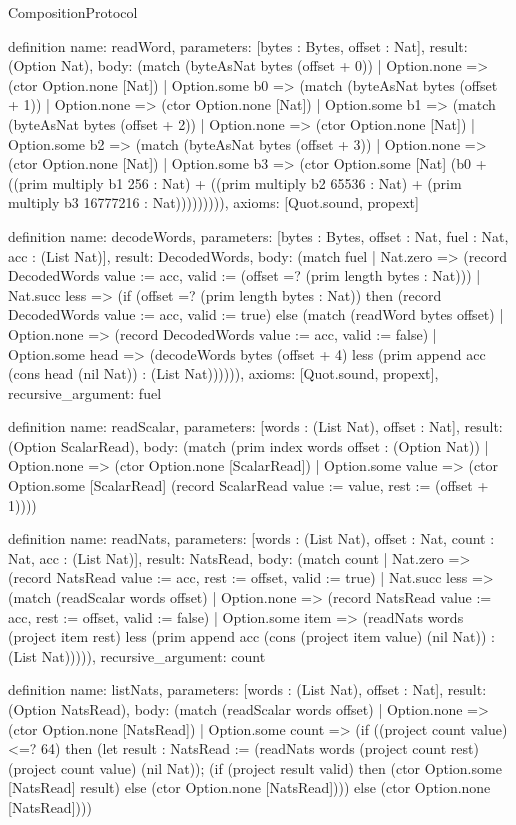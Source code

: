 \begin{lexlean}{CompositionProtocol}
\begin{semanticmodule}
definition{
  name: readWord,
  parameters: [bytes : Bytes, offset : Nat],
  result: (Option Nat),
  body: (match (byteAsNat bytes (offset + 0))
    | Option.none => (ctor Option.none [Nat])
    | Option.some b0 => (match (byteAsNat bytes (offset + 1))
      | Option.none => (ctor Option.none [Nat])
      | Option.some b1 => (match (byteAsNat bytes (offset + 2))
        | Option.none => (ctor Option.none [Nat])
        | Option.some b2 => (match (byteAsNat bytes (offset + 3))
          | Option.none => (ctor Option.none [Nat])
          | Option.some b3 => (ctor Option.some [Nat] (b0 + ((prim multiply b1 256 : Nat) + ((prim multiply b2 65536 : Nat) + (prim multiply b3 16777216 : Nat))))))))),
  axioms: [Quot.sound, propext]
}

definition{
  name: decodeWords,
  parameters: [bytes : Bytes, offset : Nat, fuel : Nat, acc : (List Nat)],
  result: DecodedWords,
  body: (match fuel
    | Nat.zero => (record DecodedWords {value := acc, valid := (offset =? (prim length bytes : Nat))})
    | Nat.succ less => (if (offset =? (prim length bytes : Nat)) then (record DecodedWords {value := acc, valid := true}) else (match (readWord bytes offset)
      | Option.none => (record DecodedWords {value := acc, valid := false})
      | Option.some head => (decodeWords bytes (offset + 4) less (prim append acc (cons head (nil Nat)) : (List Nat)))))),
  axioms: [Quot.sound, propext],
  recursive_argument: fuel
}

definition{
  name: readScalar,
  parameters: [words : (List Nat), offset : Nat],
  result: (Option ScalarRead),
  body: (match (prim index words offset : (Option Nat))
    | Option.none => (ctor Option.none [ScalarRead])
    | Option.some value => (ctor Option.some [ScalarRead] (record ScalarRead {value := value, rest := (offset + 1)})))
}

definition{
  name: readNats,
  parameters: [words : (List Nat), offset : Nat, count : Nat, acc : (List Nat)],
  result: NatsRead,
  body: (match count
    | Nat.zero => (record NatsRead {value := acc, rest := offset, valid := true})
    | Nat.succ less => (match (readScalar words offset)
      | Option.none => (record NatsRead {value := acc, rest := offset, valid := false})
      | Option.some item => (readNats words (project item rest) less (prim append acc (cons (project item value) (nil Nat)) : (List Nat))))),
  recursive_argument: count
}

definition{
  name: listNats,
  parameters: [words : (List Nat), offset : Nat],
  result: (Option NatsRead),
  body: (match (readScalar words offset)
    | Option.none => (ctor Option.none [NatsRead])
    | Option.some count => (if ((project count value) <=? 64) then (let result : NatsRead := (readNats words (project count rest) (project count value) (nil Nat)); (if (project result valid) then (ctor Option.some [NatsRead] result) else (ctor Option.none [NatsRead]))) else (ctor Option.none [NatsRead])))
}


\end{semanticmodule}
\end{lexlean}
